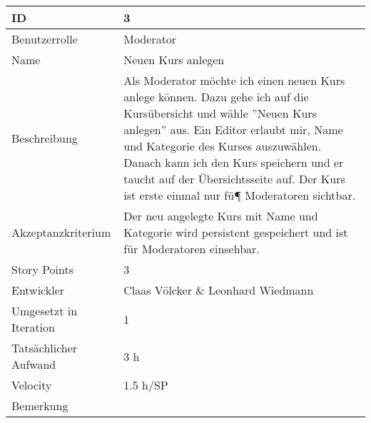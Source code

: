 \begin{tabularx}{\textwidth}{|p{}|X|}
	\hline
	ID & 3\\
	\hline
	Benutzerrolle & Moderator\\
	\hline
	Name & Neuen Kurs anlegen\\
	\hline
	Beschreibung & Als Moderator möchte ich einen neuen Kurs anlege können. Dazu gehe ich auf die Kursübersicht und wähle ''Neuen Kurs anlegen'' aus. Ein Editor erlaubt mir, Name und Kategorie des Kurses auszuwählen. Danach kann ich den Kurs speichern und er taucht auf der Übersichtsseite auf. Der Kurs ist erste einmal nur fü¶ Moderatoren sichtbar.
\\
	\hline
	Akzeptanzkriterium & Der neu angelegte Kurs mit Name und Kategorie wird persistent gespeichert und ist für Moderatoren einsehbar.\\
	\hline
	Story Points & 3\\
	\hline
	Entwickler & Claas Völcker \& Leonhard Wiedmann\\
	\hline
	Umgesetzt in Iteration & 1\\
	\hline
	Tatsächlicher Aufwand & 3 h\\
	\hline
	Velocity & 1.5 h/SP\\
	\hline
	Bemerkung & \\
	\hline
\end{tabularx}
\vspace{20pt}
